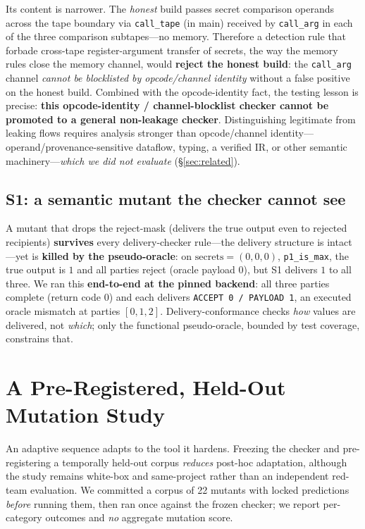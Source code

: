 \documentclass[conference]{IEEEtran}
\newcommand{\code}[1]{\texttt{\small #1}}
\newcommand{\calltape}{\code{call\_tape}}
\newcommand{\callarg}{\code{call\_arg}}
\begin{document}
Its content is narrower. The \emph{honest} build passes secret comparison operands across
the tape boundary via \calltape{} (in main) received by \callarg{} in each of the three
comparison subtapes---no memory. Therefore a detection rule that forbade cross-tape
register-argument transfer of secrets, the way the memory rules close the memory channel,
would \textbf{reject the honest build}: the \callarg{} channel \emph{cannot be blocklisted
by opcode/channel identity} without a false positive on the honest build. Combined with the
opcode-identity fact, the testing lesson is precise: \textbf{this opcode-identity /
channel-blocklist checker cannot be promoted to a general non-leakage checker}.
Distinguishing legitimate from leaking flows requires analysis stronger than
opcode/channel identity---operand/provenance-sensitive dataflow, typing, a verified IR, or
other semantic machinery---\emph{which we did not evaluate} (\S\ref{sec:related}).

\subsection{S1: a semantic mutant the checker cannot see}
\label{sec:s1}
A mutant that drops the reject-mask (delivers the true output even to rejected recipients)
\textbf{survives} every delivery-checker rule---the delivery structure is intact---yet is
\textbf{killed by the pseudo-oracle}: on $\text{secrets}=(0,0,0)$, \code{p1\_is\_max}, the
true output is $1$ and all parties reject (oracle payload $0$), but S1 delivers $1$ to all
three. We ran this \textbf{end-to-end at the pinned backend}: all three parties complete
(return code $0$) and each delivers \code{ACCEPT 0 / PAYLOAD 1}, an executed oracle
mismatch at parties $[0,1,2]$. Delivery-conformance checks \emph{how} values are delivered,
not \emph{which}; only the functional pseudo-oracle, bounded by test coverage, constrains
that.

\section{A Pre-Registered, Held-Out Mutation Study}
\label{sec:heldout}
An adaptive sequence adapts to the tool it hardens. Freezing the checker and
pre-registering a temporally held-out corpus \emph{reduces} post-hoc adaptation, although
the study remains white-box and same-project rather than an independent red-team
evaluation. We committed a corpus of 22 mutants with locked predictions \emph{before}
running them, then ran once against the frozen checker; we report per-category outcomes and
\emph{no} aggregate mutation score.
\end{document}
